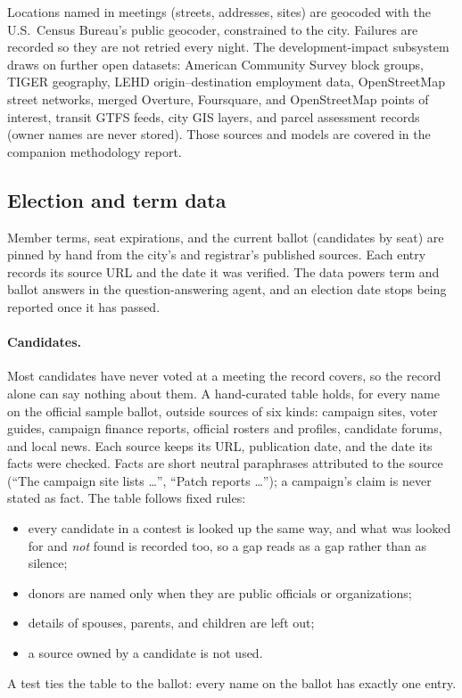 \documentclass[11pt]{article}
\begin{document}
Locations named in meetings (streets, addresses, sites) are geocoded with the U.S.\ Census
Bureau's public geocoder, constrained to the city. Failures are recorded so they are not
retried every night. The development-impact subsystem draws on further open datasets:
American Community Survey block groups, TIGER geography, LEHD origin--destination
employment data, OpenStreetMap street networks, merged Overture, Foursquare, and
OpenStreetMap points of interest, transit GTFS feeds, city GIS layers, and parcel
assessment records (owner names are never stored). Those sources and models are covered
in the companion methodology report.

\subsection{Election and term data}
\label{sec:election-data}

Member terms, seat expirations, and the current ballot (candidates by seat) are pinned
by hand from the city's and registrar's published sources. Each entry records its source
URL and the date it was verified. The data powers term and ballot answers in the
question-answering agent, and an election date stops being reported once it has passed.

\paragraph{Candidates.} Most candidates have never voted at a meeting the record covers,
so the record alone can say nothing about them. A hand-curated table holds, for every
name on the official sample ballot, outside sources of six kinds: campaign sites, voter
guides, campaign finance reports, official rosters and profiles, candidate forums, and
local news. Each source keeps its URL, publication date, and the date its facts were
checked. Facts are short neutral paraphrases attributed to the source (``The campaign
site lists \ldots'', ``Patch reports \ldots''); a campaign's claim is never stated as
fact. The table follows fixed rules:
\begin{itemize}
  \item every candidate in a contest is looked up the same way, and what was looked for
        and \emph{not} found is recorded too, so a gap reads as a gap rather than as
        silence;
  \item donors are named only when they are public officials or organizations;
  \item details of spouses, parents, and children are left out;
  \item a source owned by a candidate is not used.
\end{itemize}
A test ties the table to the ballot: every name on the ballot has exactly one entry.
\end{document}
